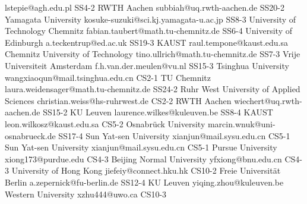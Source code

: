\begin{multicols}{2}
{ lstepie@agh.edu.pl }
{SS4-2}
{}
{ RWTH Aachen }
{ subbiah@uq.rwth-aachen.de }
{SS20-2}
{}
{ Yamagata University }
{ kosuke-suzuki@sci.kj.yamagata-u.ac.jp }
{SS8-3}
{}
{ University of Technology Chemnitz }
{ fabian.taubert@math.tu-chemnitz.de }
{SS6-4}
{}
{ University of Edinburgh }
{ a.teckentrup@ed.ac.uk }
{SS19-3}
{}
{ KAUST }
{ raul.tempone@kaust.edu.sa }
{}
{}
{ Chemnitz University of Technology }
{ tino.ullrich@math.tu-chemnitz.de }
{SS7-3}
{}
{ Vrije Universiteit Amsterdam }
{ f.h.van.der.meulen@vu.nl }
{SS15-3}
{}
{ Tsinghua University }
{ wangxiaoqun@mail.tsinghua.edu.cn }
{CS2-1}
{}
{ TU Chemnitz }
{ laura.weidensager@math.tu-chemnitz.de }
{SS24-2}
{}
{ Ruhr West University of Applied Sciences }
{ christian.weiss@hs-ruhrwest.de }
{CS2-2}
{}
{ RWTH Aachen }
{ wiechert@uq.rwth-aachen.de }
{SS15-2}
{}
{ KU Leuven }
{ laurence.wilkes@kuleuven.be }
{SS8-4}
{}
{ KAUST }
{ leon.wilkosz@kaust.edu.sa }
{CS5-2}
{}
{ Osnabrück University }
{ marcin.wnuk@uni-osnabrueck.de }
{SS17-4}
{}
{ Sun Yat-sen University }
{ xianjun@mail.sysu.edu.cn }
{CS5-1}
{}
{ Sun Yat-sen University }
{ xianjun@mail.sysu.edu.cn }
{CS5-1}
{}
{ Pursue University }
{ xiong173@purdue.edu }
{CS4-3}
{}
{ Beijing Normal University }
{ yfxiong@bnu.edu.cn }
{CS4-3}
{}
{ University of Hong Kong }
{ jiefeiy@connect.hku.hk }
{CS10-2}
{}
{ Freie Universität Berlin }
{ a.zepernick@fu-berlin.de }
{SS12-4}
{}
{ KU Leuven }
{ yiqing.zhou@kuleuven.be }
{}
{}
{ Western University }
{ xzhu444@uwo.ca }
{CS10-3}
{}

\end{multicols}

